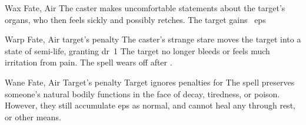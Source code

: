 \ifodd\value{diceNo}
  {}%
  {Wax}%
  {Fate, Air}%
  {}%
  {The caster makes uncomfortable statements about the target's organs, who then feels sickly and possibly retches.
  The target gains ~\glspl{ep}}%
  {}

\else

  {}%
  {Warp}%
  {Fate, Air}%
  {target's  penalty}%
  {The caster's strange stare moves the target into a state of semi-life, granting \gls{dr}~1}%
  {
    The target no longer bleeds or feels much irritation from pain.
    The spell wears off after .}

  {}%
  {Wane}%
  {Fate, Air}%
  {Target's  penalty}%
  {Target ignores   penalties for }%
  {The spell preserves someone's natural bodily functions in the face of decay, tiredness, or poison.
    However, they still accumulate \glspl{ep} as normal, and cannot heal any through rest, or other means.}

\fi
{}
